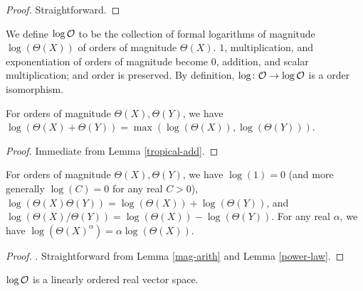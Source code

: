 \begin{proof}\leanok Straightforward.
\end{proof}

\begin{definition} \label{log-order-def}\leanok  We define $\log {\mathcal O}$ to be the collection of formal logarithms of magnitude $\log(\Theta(X))$ of orders of magnitude $\Theta(X)$.  $1$, multiplication, and exponentiation of orders of magnitude become $0$, addition, and scalar multiplication; and order is preserved. By definition, $\log \colon {\mathcal O} \to \log {\mathcal O}$ is a order isomorphism.
\end{definition}


\begin{lemma}\label{log-add}\leanok  For orders of magnitude $\Theta(X), \Theta(Y)$, we have $\log(\Theta(X) + \Theta(Y)) = \max(\log(\Theta(X)), \log(\Theta(Y)))$.
\end{lemma}

\begin{proof}\leanok Immediate from Lemma \ref{tropical-add}.
\end{proof}

\begin{lemma}\label{log-mult}\leanok  For orders of magnitude $\Theta(X), \Theta(Y)$, we have $\log(1) = 0$ (and more generally $\log(C) = 0$ for any real $C>0$), $\log(\Theta(X) \Theta(Y)) = \log(\Theta(X)) + \log(\Theta(Y))$, and $\log(\Theta(X) / \Theta(Y)) = \log(\Theta(X)) - \log(\Theta(Y))$.  For any real $\alpha$, we have $\log(\Theta(X)^\alpha) = \alpha \log(\Theta(X))$.
\end{lemma}

\begin{proof}. Straightforward from Lemma \ref{mag-arith} and Lemma \ref{power-law}.
\end{proof}


\begin{lemma}\label{ord-vec} $\log {\mathcal O}$ is a linearly ordered real vector space.
\end{lemma}

